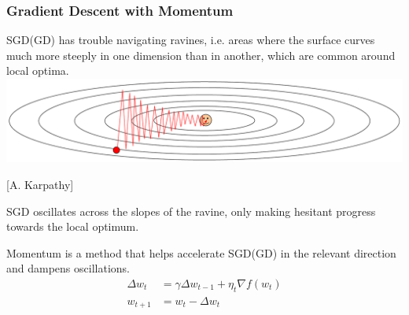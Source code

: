 \documentclass[xcolor=dvipsnames]{beamer}
\begin{document}
  \begin{frame}
   \frametitle{Gradient Descent with Momentum}
 \bi
 \item SGD(GD) has trouble navigating ravines, i.e. areas where the
   surface curves much more steeply in one dimension than in another,
   which are common around local optima. 
\includegraphics[width=.8\textwidth]{ravine-karpathy}

[A. Karpathy]
\item SGD oscillates across the slopes of the ravine, only making hesitant progress towards the local optimum.
 \item Momentum is a method that helps accelerate SGD(GD) in the relevant direction and dampens oscillations.
 \pause
 \begin{align*}
 \Delta w_{t} &= \gamma \Delta w_{t-1} + \eta _t \nabla f(w_t)\\
 w_{t+1} &= w_t - \Delta w_{t}
 \end{align*}
 \ei
 \end{frame}
\end{document}
